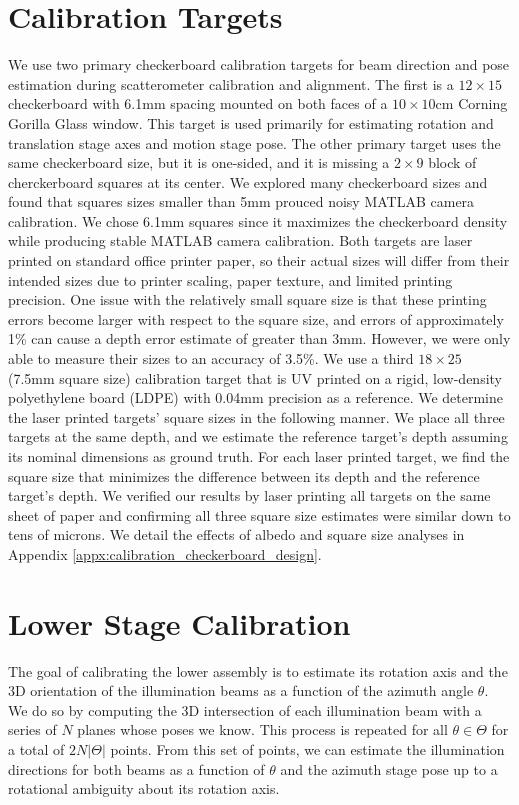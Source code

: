\section{Calibration Targets}
We use two primary checkerboard calibration targets for beam direction and pose estimation during scatterometer calibration and alignment. The first is a $12\times15$ checkerboard with 6.1mm spacing mounted on both faces of a $10\times10$cm Corning Gorilla Glass window. This target is used primarily for estimating rotation and translation stage axes and motion stage pose. The other primary target uses the same checkerboard size, but it is one-sided, and it is missing a $2\times9$ block of cherckerboard squares at its center. We explored many checkerboard sizes and found that squares sizes smaller than 5mm prouced noisy MATLAB camera calibration. We chose 6.1mm squares since it maximizes the checkerboard density while producing stable MATLAB camera calibration. Both targets are laser printed on standard office printer paper, so their actual sizes will differ from their intended sizes due to printer scaling, paper texture, and limited printing precision. One issue with the relatively small square size is that these printing errors become larger with respect to the square size, and errors of approximately 1\% can cause a depth error estimate of greater than 3mm. However, we were only able to measure their sizes to an accuracy of 3.5\%. We use a third $18\times25$ (7.5mm square size) calibration target that is UV printed on a rigid, low-density polyethylene board (LDPE) with 0.04mm precision as a reference. We determine the laser printed targets' square sizes in the following manner. We place all three targets at the same depth, and we estimate the reference target's depth assuming its nominal dimensions as ground truth. For each laser printed target, we find the square size that minimizes the difference between its depth and the reference target's depth. We verified our results by laser printing all targets on the same sheet of paper and confirming all three square size estimates were similar down to tens of microns. We detail the effects of albedo and square size analyses in Appendix \ref{appx:calibration_checkerboard_design}.

\section{Lower Stage Calibration} \label{sec:lower_stage_calibration}
The goal of calibrating the lower assembly is to estimate its rotation axis and the 3D orientation of the illumination beams as a function of the azimuth angle $\theta$. We do so by computing the 3D intersection of each illumination beam with a series of $N$ planes whose poses we know. This process is repeated for all $\theta \in \Theta$ for a total of $2N|\Theta|$ points. From this set of points, we can estimate the illumination directions for both beams as a function of $\theta$ and the azimuth stage pose up to a rotational ambiguity about its rotation axis.

